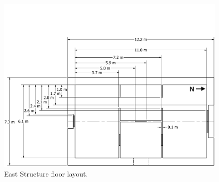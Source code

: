 \documentclass[12pt,oneside]{book}
\begin{document}
\begin{figure}[!ht]
	\includegraphics[width=\columnwidth]{../Figures/Floor_Plans/East_Test_Structure_Dimensioned_Full}
	\caption[Dimensioned floor plan of the East Structure.]{East Structure floor layout.}
	\label{fig:east_dimensioned_plan}
\end{figure}
\end{document}
